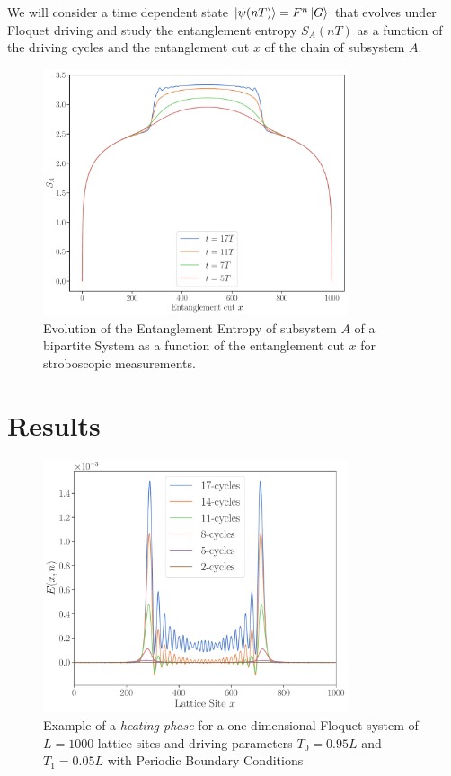 \documentclass[11pt, a4paper]{article}
\theoremstyle{definition} %
\begin{document}
	We will consider a time dependent state $\ket{\psi(nT)} = F^n \ket{G}$ that evolves under Floquet driving and study the entanglement entropy $S_A(nT)$ as a function of the driving cycles and the entanglement cut $x$ of the chain of subsystem $A$.
	
	
	\begin{figure}[h]
		\centering
		\includegraphics[width=0.8\textwidth]{Entanglement_Entropy}
		\caption{Evolution of the Entanglement Entropy of subsystem $A$ of a bipartite System as a function of the entanglement cut $x$ for stroboscopic measurements.}
		\label{}
	\end{figure}




	
	\section{Results} 
	
	
	\begin{figure}[h]
		\centering
		\includegraphics[width=0.8\textwidth]{Energy_Density1}
		\caption{Example of a \textit{heating phase} for a one-dimensional Floquet system of $L=1000$ lattice sites and driving parameters $T_0= 0.95L$ and $T_1 = 0.05L$ with Periodic Boundary Conditions}
	\end{figure}
	
\end{document}
